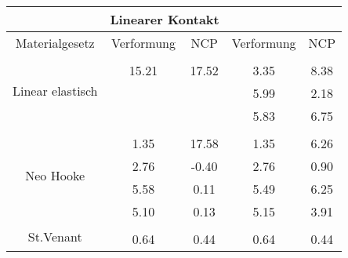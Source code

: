 \begin{table} 
\centering 
\begin{tabular}{c|cc|cc|} 
\cline{2-5} 
 & \multicolumn{2}{|c|}{Linearer Kontakt} &  \\ 
\hline 
\multicolumn{1}{|c|}{Materialgesetz} & \multicolumn{1}{c|}{Verformung} & \multicolumn{1}{c|}{NCP} & \multicolumn{1}{c|}{Verformung} & \multicolumn{1}{c|}{NCP} \\ 
\hline 
\multicolumn{1}{|c|}{\multirow{4}{*}{Linear elastisch}} &\multicolumn{1}{|c|}{} & \multicolumn{1}{|c|}{} & \multicolumn{1}{|c|}{} & \multicolumn{1}{|c|}{} \\ 
\multicolumn{1}{|c|}{} & \multicolumn{1}{|c|}{     15.21} & \multicolumn{1}{|c|}{     17.52} & \multicolumn{1}{|c|}{      3.35} & \multicolumn{1}{|c|}{      8.38} \\ 
\multicolumn{1}{|c|}{} & \multicolumn{1}{|c|}{} & \multicolumn{1}{|c|}{} & \multicolumn{1}{|c|}{      5.99} & \multicolumn{1}{|c|}{      2.18} \\ 
\multicolumn{1}{|c|}{} & \multicolumn{1}{|c|}{} & \multicolumn{1}{|c|}{} & \multicolumn{1}{|c|}{      5.83} & \multicolumn{1}{|c|}{      6.75} \\ 
\hline 
\multicolumn{1}{|c|}{\multirow{5}{*}{Neo Hooke}} &\multicolumn{1}{|c|}{} & \multicolumn{1}{|c|}{} & \multicolumn{1}{|c|}{} & \multicolumn{1}{|c|}{} \\ 
\multicolumn{1}{|c|}{} & \multicolumn{1}{|c|}{      1.35} & \multicolumn{1}{|c|}{     17.58} & \multicolumn{1}{|c|}{      1.35} & \multicolumn{1}{|c|}{      6.26} \\ 
\multicolumn{1}{|c|}{} & \multicolumn{1}{|c|}{      2.76} & \multicolumn{1}{|c|}{     -0.40} & \multicolumn{1}{|c|}{      2.76} & \multicolumn{1}{|c|}{      0.90} \\ 
\multicolumn{1}{|c|}{} & \multicolumn{1}{|c|}{      5.58} & \multicolumn{1}{|c|}{      0.11} & \multicolumn{1}{|c|}{      5.49} & \multicolumn{1}{|c|}{      6.25} \\ 
\multicolumn{1}{|c|}{} & \multicolumn{1}{|c|}{      5.10} & \multicolumn{1}{|c|}{      0.13} & \multicolumn{1}{|c|}{      5.15} & \multicolumn{1}{|c|}{      3.91} \\ 
\hline 
\multicolumn{1}{|c|}{\multirow{5}{*}{St.Venant}} &\multicolumn{1}{|c|}{} & \multicolumn{1}{|c|}{} & \multicolumn{1}{|c|}{} & \multicolumn{1}{|c|}{} \\ 
\multicolumn{1}{|c|}{} & \multicolumn{1}{|c|}{      0.64} & \multicolumn{1}{|c|}{      0.44} & \multicolumn{1}{|c|}{      0.64} & \multicolumn{1}{|c|}{      0.44} \\ 

\end{tabular}
\end{table}
